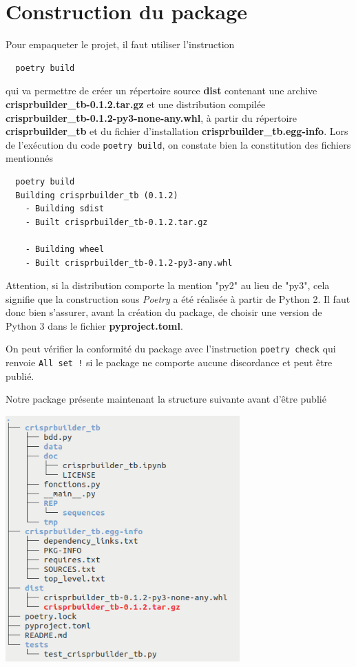 \documentclass[twoside,a4paper,11pt,frenchb,openany]{report}
\begin{document}
\section{Construction du package}

Pour empaqueter le projet, il faut utiliser l’instruction

\begin{verbatim}
  poetry build
\end{verbatim}

qui va permettre de créer un répertoire source \textbf{dist} contenant une archive \textbf{crisprbuilder\_tb-0.1.2.tar.gz} et une distribution compilée \textbf{crisprbuilder\_tb-0.1.2-py3-none-any.whl}, à partir du répertoire \textbf{crisprbuilder\_tb} et du fichier d'installation \textbf{crisprbuilder\_tb.egg-info}. Lors de l'exécution du code \texttt{poetry build}, on constate bien la constitution des fichiers mentionnés

\begin{verbatim}  poetry build
  Building crisprbuilder_tb (0.1.2)
    - Building sdist
    - Built crisprbuilder_tb-0.1.2.tar.gz

    - Building wheel
    - Built crisprbuilder_tb-0.1.2-py3-any.whl\end{verbatim}

Attention, si la distribution comporte la mention "py2" au lieu de "py3", cela signifie que la construction sous \textit{Poetry} a été réalisée à partir de Python 2. Il faut donc bien s'assurer, avant la création du package, de choisir une version de Python 3 dans le fichier \textbf{pyproject.toml}.

On peut vérifier la conformité du package avec l’instruction
\texttt{poetry check}
qui renvoie
\texttt{All set !}
si le package ne comporte aucune discordance et peut être publié.

Notre package présente maintenant la structure suivante avant d'être publié

\includegraphics[width=9cm]{crispr_etape4.png}
\end{document}
